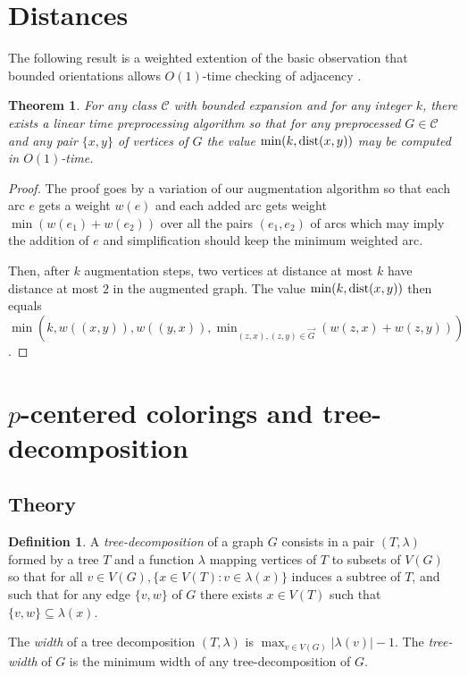 \documentclass[a4paper]{amsart}
\newtheorem{theorem}{Theorem}[section]
\theoremstyle{definition}
\newtheorem{definition}{Definition}[section]
\theoremstyle{remark}
\newcommand{\card}[1]{\lvert{#1}\rvert}
\def\vG{\vec{G}}
\begin{document}
\section{Distances}
The following result is a weighted extention of
the basic observation that bounded orientations allows $O(1)$-time
checking of adjacency \cite{chrobak}.

\begin{theorem}
For any class $\mathcal C$ with bounded expansion and for any integer
$k$, there exists a linear time preprocessing algorithm so that for
any preprocessed
$G\in\mathcal C$ and any pair $\{x,y\}$ of vertices of $G$ the value
$\min(k,{\rm dist}(x,y))$ may be computed in $O(1)$-time.
\end{theorem}
\begin{proof}
The proof goes by a variation of our augmentation algorithm so that
each arc $e$ gets a weight $w(e)$ and each added arc gets weight
$\min(w(e_1)+w(e_2))$ over all the pairs $(e_1,e_2)$ of arcs which may
imply the addition of $e$ and 
simplification should keep the minimum weighted arc.

Then, after $k$ augmentation steps, two vertices at distance at most
$k$ have distance at most $2$ in the augmented graph. The value
$\min(k,{\rm dist}(x,y))$ then equals
$\min(k,w((x,y)),w((y,x)),\min_{(z,x),(z,y)\in\vG}(w(z,x)+w(z,y)))$.
\end{proof}


\section{$p$-centered colorings and tree-decomposition}
\subsection{Theory}

\begin{definition}
A {\em tree-decomposition} of a graph $G$ consists in a pair $(T,\lambda)$
formed by a tree $T$ and a function $\lambda$ mapping vertices of $T$
to subsets of $V(G)$ so that for all $v\in V(G), \{x\in V(T):
v\in\lambda(x)\}$ induces a subtree of $T$, and such that
for any edge $\{v,w\}$ of $G$ there exists $x\in V(T)$ such that
$\{v,w\}\subseteq\lambda(x)$. 

The {\em width} of a tree decomposition  $(T,\lambda)$ is $\max_{v\in
V(G)}\card{\lambda(v)}-1$. The {\em tree-width} of $G$ is the minimum
width of any tree-decomposition of $G$.
\end{definition}
\end{document}

